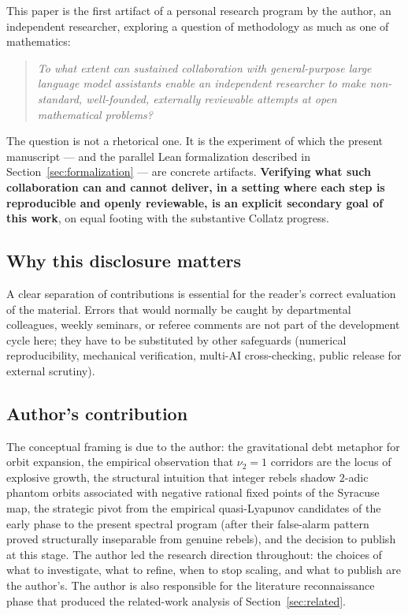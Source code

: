 \documentclass[11pt,a4paper]{article}
\theoremstyle{definition}
\begin{document}
This paper is the first artifact of a personal research program by
the author, an independent researcher, exploring a question of
methodology as much as one of mathematics:
\begin{quote}
\emph{To what extent can sustained collaboration with general-purpose
large language model assistants enable an independent researcher to
make non-standard, well-founded, externally reviewable attempts at
open mathematical problems?}
\end{quote}
The question is not a rhetorical one. It is the experiment of which
the present manuscript --- and the parallel Lean formalization
described in Section~\ref{sec:formalization} --- are concrete
artifacts. \textbf{Verifying what such collaboration can and cannot
deliver, in a setting where each step is reproducible and openly
reviewable, is an explicit secondary goal of this work}, on equal
footing with the substantive Collatz progress.

\subsection{Why this disclosure matters}

A clear separation of contributions is essential for the reader's
correct evaluation of the material. Errors that would normally be
caught by departmental colleagues, weekly seminars, or referee
comments are not part of the development cycle here; they have to
be substituted by other safeguards (numerical reproducibility,
mechanical verification, multi-AI cross-checking, public release
for external scrutiny).

\subsection{Author's contribution}

The conceptual framing is due to the author: the gravitational
debt metaphor for orbit expansion, the empirical observation that
$\nu_2 = 1$ corridors are the locus of explosive growth, the
structural intuition that integer rebels shadow $2$-adic phantom
orbits associated with negative rational fixed points of the
Syracuse map, the strategic pivot from the empirical
quasi-Lyapunov candidates of the early phase to the present
spectral program (after their false-alarm pattern proved
structurally inseparable from genuine rebels), and the decision to
publish at this stage. The author led the research direction
throughout: the choices of what to investigate, what to refine,
when to stop scaling, and what to publish are the author's. The
author is also responsible for the literature reconnaissance
phase that produced the related-work analysis of
Section~\ref{sec:related}.
\end{document}
